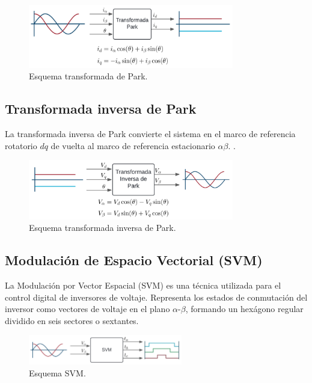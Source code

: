 \documentclass[11pt]{report}
\begin{document}
\begin{figure}[ht]
	\centering
	\includegraphics[width=0.8\textwidth]{imagenes/Diagramas/park.png}
	\caption{Esquema transformada de Park.}
\end{figure}
\FloatBarrier

\subsection{Transformada inversa de Park}
La transformada inversa de Park convierte el sistema en el marco de referencia rotatorio \(dq\) de vuelta al marco de referencia estacionario \(\alpha\beta\). \cite{AN1078}.

\begin{figure}[ht]
	\centering
	\includegraphics[width=0.8\textwidth]{imagenes/Diagramas/park_inv.png}
	\caption{Esquema transformada inversa de Park.}
\end{figure}
\FloatBarrier

\newpage
\subsection{Modulación de Espacio Vectorial (SVM)}
La Modulación por Vector Espacial (SVM) es una técnica utilizada para el control digital de inversores de voltaje. Representa los estados de conmutación del inversor como vectores de voltaje en el plano $\alpha$-$\beta$, formando un hexágono regular dividido en seis sectores o sextantes.

\begin{figure}[ht]
	\centering
	\includegraphics[width=0.6\textwidth]{imagenes/Diagramas/SVM.png}
	\caption{Esquema SVM.}
\end{figure}
\FloatBarrier
\end{document}

